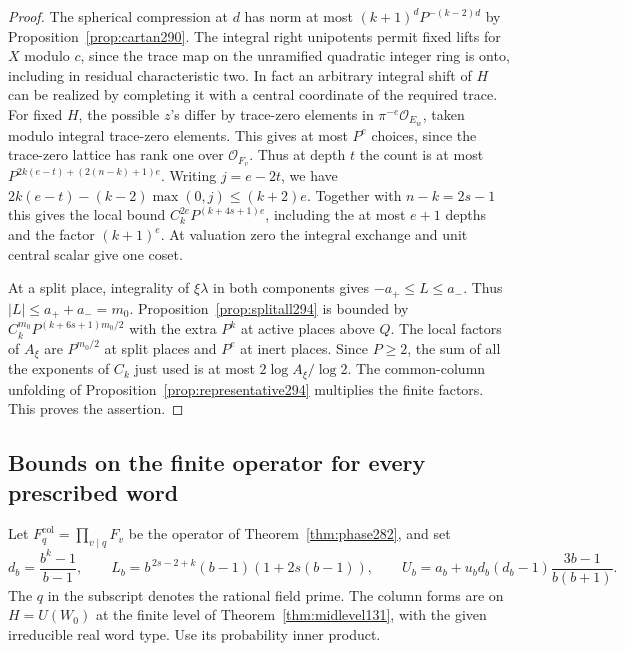 \documentclass[a4paper,11pt]{article}
\theoremstyle{definition}
\theoremstyle{remark}
\numberwithin{equation}{section}
\begin{document}
\begin{proof}
The spherical compression at \(d\) has norm at most
\((k+1)^dP^{-(k-2)d}\) by Proposition~\ref{prop:cartan290}.
The integral right unipotents permit fixed lifts for \(X\)
modulo \(c\), since the trace map on the unramified
quadratic integer ring is onto, including in residual
characteristic two. In fact an arbitrary integral shift
of \(H\) can be realized by completing it with a central
coordinate of the required trace. For fixed \(H\), the
possible \(z\)'s differ by trace-zero elements in
\(\pi^{-e}\mathcal O_{E_w}\), taken modulo integral
trace-zero elements. This gives at most \(P^e\) choices,
since the trace-zero lattice has rank one over
\(\mathcal O_{F_v}\). Thus at depth \(t\) the count is at
most \(P^{2k(e-t)+(2(n-k)+1)e}\). Writing \(j=e-2t\),
we have \(2k(e-t)-(k-2)\max(0,j)\le(k+2)e\).
Together with \(n-k=2s-1\) this gives the local bound
\(C_k^{2e}P^{(k+4s+1)e}\), including the at most
\(e+1\) depths and the factor \((k+1)^e\). At valuation
zero the integral exchange and unit central scalar give
one coset.

At a split place, integrality of \(\xi\lambda\) in both
components gives \(-a_+\le L\le a_-\). Thus
\(|L|\le a_++a_-=m_0\). Proposition~\ref{prop:splitall294}
is bounded by \(C_k^{m_0}P^{(k+6s+1)m_0/2}\) with the
extra \(P^k\) at active places above \(Q\). The local
factors of \(A_\xi\) are \(P^{m_0/2}\) at split places
and \(P^e\) at inert places. Since \(P\ge2\), the sum of
all the exponents of \(C_k\) just used is at most
\(2\log A_\xi/\log 2\). The common-column unfolding of
Proposition~\ref{prop:representative294} multiplies the
finite factors. This proves the assertion.
\end{proof}

\subsection{Bounds on the finite operator for every prescribed word}\label{nav:V-46}
Let \(F_q^{\mathrm{col}}=\prod_{v\mid q}F_v\) be the operator
of Theorem~\ref{thm:phase282}, and set
\[
 d_b=\frac{b^k-1}{b-1},\qquad
 L_b=b^{\,2s-2+k}(b-1)(1+2s(b-1)),\qquad
 U_b=a_b+u_b d_b(d_b-1)\frac{3b-1}{b(b+1)} .
\]
The \(q\) in the subscript denotes the rational field prime.
The column forms are on \(H=U(W_0)\) at the finite level of
Theorem~\ref{thm:midlevel131}, with the given irreducible
real word type. Use its probability inner product.
\end{document}
